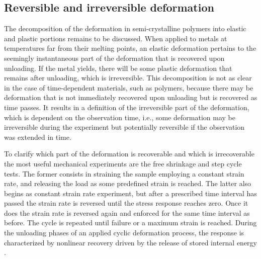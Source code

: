 

\subsection{Reversible and irreversible deformation}

The decomposition of the deformation in semi-crystalline polymers into elastic and plastic portions remains to be discussed.
When applied to metals at temperatures far from their melting points, an elastic deformation pertains to the seemingly instantaneous part of the deformation that is recovered upon unloading.
If the metal yields, there will be some plastic deformation that remains after unloading, which is irreversible.
This decomposition is not as clear in the case of time-dependent materials, such as polymers, because there may be deformation that is not immediately recovered upon unloading but is recovered as time passes.
It results in a definition of the irreversible part of the deformation, which is dependent on the observation time, i.e., some deformation may be irreversible during the experiment but potentially reversible if the observation was extended in time.

To clarify which part of the deformation is recoverable and which is irrecoverable the most useful mechanical experiments are the free shrinkage and step cycle tests.
The former consists in straining the sample employing a constant strain rate, and releasing the load as some predefined strain is reached.
The latter also begins as constant strain rate experiment, but after a prescribed time interval has passed the strain rate is reversed until the stress response reaches zero.
Once it does the strain rate is reversed again and enforced for the same time interval as before.
The cycle is repeated until failure or a maximum strain is reached.
During the unloading phases of an applied cyclic deformation process, the response is characterized by nonlinear recovery driven by the release of stored internal energy \citep{bergstromConstitutiveModelingUltrahigh2002}.

